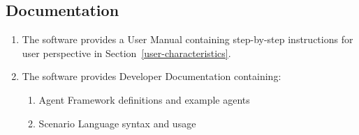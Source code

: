 \documentclass[titlepage]{article}
\begin{document}

\subsection{Documentation%
  \label{documentation}%
}
\begin{enumerate}
    \item The software provides a User Manual containing step-by-step instructions for user perspective in Section~\ref{user-characteristics}.
    \item The software provides Developer Documentation containing:
    \begin{enumerate}
        \item Agent Framework definitions and example agents
        \item Scenario Language syntax and usage
    \end{enumerate}
\end{enumerate}


\appendix
\pagebreak
\end{document}
